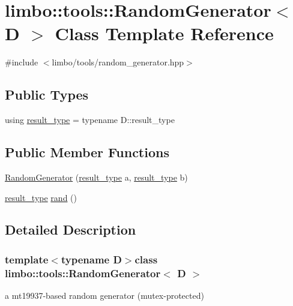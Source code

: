 \hypertarget{classlimbo_1_1tools_1_1_random_generator}{}\section{limbo\+:\+:tools\+:\+:Random\+Generator$<$ D $>$ Class Template Reference}
\label{classlimbo_1_1tools_1_1_random_generator}


{\ttfamily \#include $<$limbo/tools/random\+\_\+generator.\+hpp$>$}

\subsection*{Public Types}
\begin{DoxyCompactItemize}
\item 
using \hyperlink{classlimbo_1_1tools_1_1_random_generator_ae5fdd214eb4fb253cf9f35b9ca7451ba}{result\+\_\+type} = typename D\+::result\+\_\+type
\end{DoxyCompactItemize}
\subsection*{Public Member Functions}
\begin{DoxyCompactItemize}
\item 
\hyperlink{classlimbo_1_1tools_1_1_random_generator_add326a72657fc6034b13c13d1a4e848c}{Random\+Generator} (\hyperlink{classlimbo_1_1tools_1_1_random_generator_ae5fdd214eb4fb253cf9f35b9ca7451ba}{result\+\_\+type} a, \hyperlink{classlimbo_1_1tools_1_1_random_generator_ae5fdd214eb4fb253cf9f35b9ca7451ba}{result\+\_\+type} b)
\item 
\hyperlink{classlimbo_1_1tools_1_1_random_generator_ae5fdd214eb4fb253cf9f35b9ca7451ba}{result\+\_\+type} \hyperlink{classlimbo_1_1tools_1_1_random_generator_a8428af24ab2e4eb744563d12180b6246}{rand} ()
\end{DoxyCompactItemize}


\subsection{Detailed Description}
\subsubsection*{template$<$typename D$>$class limbo\+::tools\+::\+Random\+Generator$<$ D $>$}

a mt19937-\/based random generator (mutex-\/protected)

